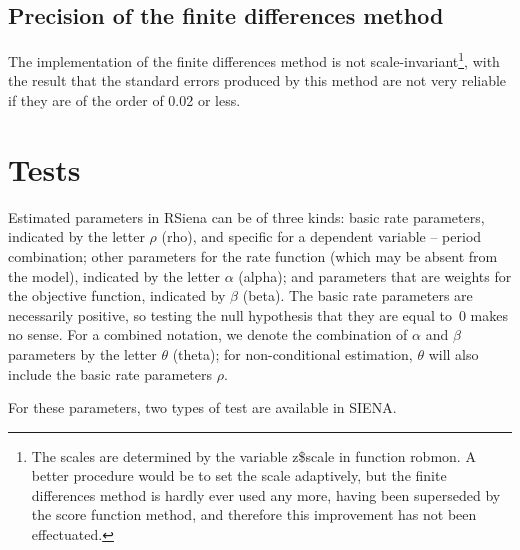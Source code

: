 \documentclass[a4paper,fleqn,11pt]{article}
\newcommand{\+}{\, + \,}
\newcommand{\sfn}[1]{\textsf{#1}}
\newcommand{\RS}{{\sf \textsf{RSiena} }}
\newcommand{\si}{{\sf SIENA}}
\begin{document}
\subsection{Precision of the finite differences method}

The implementation of the finite differences method is not
scale-invariant\footnote{The scales are determined by the
variable \sfn{z\$scale} in function \sfn{robmon}.
A better procedure would be to set the scale adaptively,
but the finite differences method is hardly ever used any more,
having been superseded by the score function method,
and therefore this improvement has not been effectuated.},
with the result that the standard errors produced by this method
are not very reliable if they are of the order of 0.02 or less.


\newpage
\section{Tests}
\label{S_test}

Estimated parameters in \RS can be of three kinds:
basic rate parameters, indicated by the letter $\rho$ (rho), and specific for a
dependent variable -- period combination; other parameters for the rate function
(which may be absent from the model), indicated by the letter $\alpha$ (alpha);
and parameters that are weights for the objective function, indicated by $\beta$ (beta).
The basic rate parameters are necessarily positive,
so testing the null hypothesis that they are equal to~0 makes no sense.
For a combined notation, we denote the combination of $\alpha$ and $\beta$ parameters
by the letter $\theta$ (theta); for non-conditional estimation,
$\theta$ will also include the basic rate parameters $\rho$.

For these parameters, two types of test are available in \si.
\end{document}
